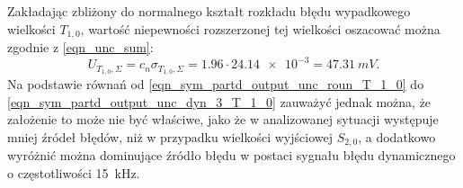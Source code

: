 Zakładając zbliżony do normalnego kształt rozkładu błędu wypadkowego wielkości $T_{1,0}$, wartość niepewności rozszerzonej tej wielkości oszacować można zgodnie z \eqref{eqn_unc_sum}:
\begin{equation} 
U_{T_{1,0},\Sigma} = c_{n} \sigma_{T_{1,0},\Sigma} = 1.96 \cdot \num{24.14e-3} = \qty{47.31}{mV} \label{eqn_sym_partd_output_unc_total_a_T_1_0}.
\end{equation}
Na podstawie równań od \eqref{eqn_sym_partd_output_unc_roun_T_1_0} do \eqref{eqn_sym_partd_output_unc_dyn_3_T_1_0} zauważyć jednak można, że założenie to może nie być właściwe, jako że w analizowanej sytuacji występuje mniej źródeł błędów, niż w przypadku wielkości wyjściowej $S_{2,0}$, a dodatkowo wyróżnić można dominujące źródło błędu w postaci sygnału błędu dynamicznego o częstotliwości \qty{15}{kHz}.

